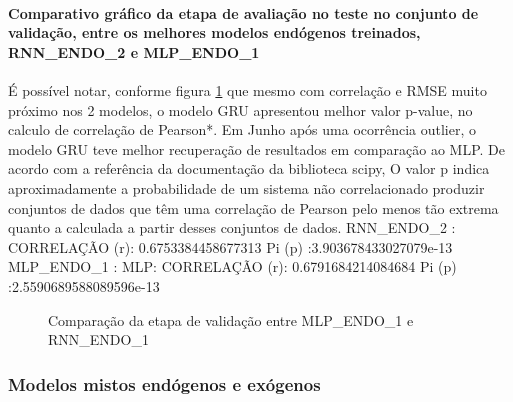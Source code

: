 \documentclass[	12pt, Times, openright, twoside, a4paper, english, brazil]{abntex2}
\begin{document}
                \paragraph{Comparativo gráfico da etapa de avaliação no teste no conjunto de validação, entre os melhores modelos endógenos treinados, RNN\_ENDO\_2 e MLP\_ENDO\_1}
                  É possível notar, conforme figura \ref{fig:case1_gru_mlp_val_analise} que mesmo com correlação e RMSE muito próximo nos 2 modelos, o modelo GRU apresentou melhor valor p-value, no calculo de correlação de Pearson*. 
                  Em Junho após uma ocorrência outlier, o modelo GRU teve melhor recuperação de resultados em comparação ao MLP.
                  De acordo com a referência da documentação da biblioteca scipy, O valor p indica aproximadamente a probabilidade de um sistema não correlacionado produzir conjuntos de dados que têm uma correlação de Pearson pelo menos tão extrema quanto a calculada a partir desses conjuntos de dados.\newline
                  RNN\_ENDO\_2 : CORRELAÇÃO (r): 0.6753384458677313 Pi (p) :3.903678433027079e-13\newline
                  MLP\_ENDO\_1 : MLP: CORRELAÇÃO (r): 0.6791684214084684 Pi (p) :2.5590689588089596e-13\newline
                  \begin{figure}[!ht]
                      \caption{Comparação da etapa de validação entre MLP\_ENDO\_1 e RNN\_ENDO\_1 \label{fig:case1_gru_mlp_val_analise} }
                    \end{figure}

    	    \subsubsection{Modelos mistos endógenos e exógenos}
\end{document}
